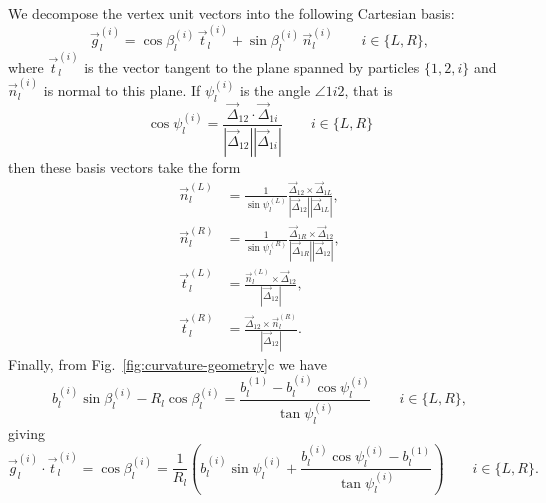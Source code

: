 \documentclass[11pt,twoside]{report}
\begin{document}
We decompose the vertex unit vectors into the following Cartesian basis:
\begin{equation}\label{eq:vertex-unit-vector}
  \vec{g}_l^{(i)} =
  \cos{\beta_l^{(i)}} \, \vec{t}_l^{(i)} + \sin{\beta_l^{(i)}} \, \vec{n}_l^{(i)}
  \qquad i \in \{L,R\},
\end{equation}
where $\vec{t}_l^{(i)}$ is the vector tangent to the plane spanned by particles $\{1,2,i\}$ and $\vec{n}_l^{(i)}$ is normal to this plane.
If $\psi_l^{(i)}$ is the angle $\angle 1i2$, that is
\begin{equation}\label{eq:cos-psi}
  \cos{\psi_l^{(i)}} =
  \frac{\vec{\Delta}_{12} \cdot \vec{\Delta}_{1i}}
  {|\vec{\Delta}_{12}||\vec{\Delta}_{1i}|}
  \qquad i \in \{L,R\}
\end{equation}
then these basis vectors take the form
\begin{subequations}\label{eq:vertex-unit-vector-basis}
\begin{align}
  \vec{n}_l^{(L)} &=
  \frac{1}{\sin{\psi_l^{(L)}}}
  \frac{\vec{\Delta}_{12} \times \vec{\Delta}_{1L}}
  {|\vec{\Delta}_{12}||\vec{\Delta}_{1L}|}, \\
  \vec{n}_l^{(R)} &=
  \frac{1}{\sin{\psi_l^{(R)}}}
  \frac{\vec{\Delta}_{1R} \times \vec{\Delta}_{12}}
  {|\vec{\Delta}_{1R}||\vec{\Delta}_{12}|}, \\
  \vec{t}_l^{(L)} &=
  \frac{\vec{n}_l^{(L)} \times \vec{\Delta}_{12}}{|\vec{\Delta}_{12}|}, \\
  \vec{t}_l^{(R)} &=
  \frac{\vec{\Delta}_{12} \times \vec{n}_l^{(R)}}{|\vec{\Delta}_{12}|}.
\end{align}
\end{subequations}
Finally, from Fig.\ \ref{fig:curvature-geometry}c we have
\begin{equation}
  b_l^{(i)} \sin{\beta_l^{(i)}} - R_l \cos{\beta_l^{(i)}}
  = \frac{b_l^{(1)} - b_l^{(i)} \cos{\psi_l^{(i)}}}{\tan{\psi_l^{(i)}}}
  \qquad i \in \{L,R\},
\end{equation}
giving
\begin{equation}\label{eq:cos-beta}
  \vec{g}_l^{(i)} \cdot \vec{t}_l^{(i)} = \cos{\beta_l^{(i)}} =
  \frac{1}{R_l} \left(
    b_l^{(i)} \sin{\psi_l^{(i)}}
    + \frac{b_l^{(i)} \cos{\psi_l^{(i)}} - b_l^{(1)}}{\tan{\psi_l^{(i)}}}
  \right)
  \qquad i \in \{L,R\}.
\end{equation}
\end{document}
